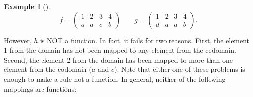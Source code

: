 \documentclass[10pt,]{book}
\theoremstyle{plain}
\theoremstyle{definition}
\theoremstyle{definition}
\newtheorem{example}[theorem]{Example}
\theoremstyle{definition}
\numberwithin{equation}{chapter}
\newlength{\panelmax}
\newcommand{\amp}{&}
\begin{document}
\begin{example}[]
\begin{equation*}
f= \begin{pmatrix} 1 \amp 2 \amp 3 \amp 4 \\ d \amp a \amp c \amp b \end{pmatrix} \qquad g = \begin{pmatrix} 1 \amp 2 \amp 3 \amp 4 \\ d \amp a \amp a \amp b \end{pmatrix}.
\end{equation*}
%
\par
\hypertarget{p-2102}{}%
However, \(h\) is NOT a function. In fact, it fails for two reasons. First, the element 1 from the domain has not been mapped to any element from the codomain. Second, the element 2 from the domain has been mapped to more than one element from the codomain (\(a\) and \(c\)). Note that either one of these problems is enough to make a rule not a function. In general, neither of the following mappings are functions:%
{%
\setlength{\panelmax}{0pt}
\ifdefined\panelboxAimage\else\newsavebox{\panelboxAimage}\fi%
\begin{lrbox}{\panelboxAimage}
\end{lrbox}
\ifdefined\phAimage\else\newlength{\phAimage}\fi%
\setlength{\phAimage}{\ht\panelboxAimage+\dp\panelboxAimage}
\settototalheight{\phAimage}{\usebox{\panelboxAimage}}
\setlength{\panelmax}{\maxof{\panelmax}{\phAimage}}
\ifdefined\panelboxBimage\else\newsavebox{\panelboxBimage}\fi%
\begin{lrbox}{\panelboxBimage}
\end{lrbox}
\ifdefined\phBimage\else\newlength{\phBimage}\fi%
}
\end{example}
\end{document}
